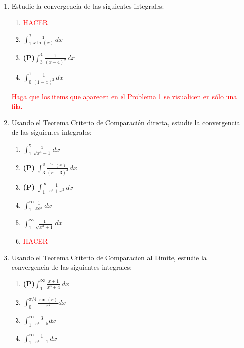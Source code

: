 \documentclass[11pt]{article}
\begin{document}
\begin{enumerate}

\item Estudie la convergencia de las siguientes integrales:
  \begin{multicols}{2}
    \begin{enumerate}
    \item \textcolor{red}{HACER}
    \item  $\int_{1}^{2} \frac{1}{x \ln(x)} \,dx$
    \item {\bf (P)}$\int_{3}^{4} \frac{1}{(x-4)^2} \,dx$
    \item $\int_{0}^{1} \frac{1}{(1-x)^2} \,dx$
    \end{enumerate}
  \end{multicols}
  \textcolor{red}{Haga que los items que aparecen en el Problema 1 se
  visualicen en s\'olo una fila.}


\item Usando el Teorema Criterio de Comparaci\'on directa, estudie la
  convergencia de las siguientes integrales:
  \begin{multicols}{2}
    \begin{enumerate}
    \item $\int_{1}^{5}\frac{1}{\sqrt{x^4-1}}\, dx$
    \item {\bf (P)} $\int_{3}^{6} \frac{\ln(x)}{(x-3)^4} \,dx$
    \item {\bf (P)} $\int_{1}^{\infty}\frac{1}{e^{x}+x^{2}}\,dx$
    \item $\int_{1}^{\infty} \frac{1}{xe^{x}} \,dx$
    \item $\int_{1}^{\infty}\frac{1}{\sqrt{x^{3}+1}}\,dx$
    \item \textcolor{red}{HACER}
    \end{enumerate}
  \end{multicols}


\item Usando el Teorema Criterio de Comparaci\'on al L\'imite, estudie la
  convergencia de las siguientes integrales:
  \begin{multicols}{4}
    \begin{enumerate}
    \item {\bf (P)}$\int_{1}^{\infty}\frac{x+1}{x^3+4}\, dx$
    \item $\int_{0}^{\pi/4}\frac{\sin(x)}{x^{2}}dx$
    \item $\int_{1}^{\infty}\frac{3}{e^{x}+5}dx$
    \item $\int_{1}^{\infty}\frac{1}{e^{x}+1}\, dx$ 
    \end{enumerate}
  \end{multicols}


\end{enumerate}
\end{document}

